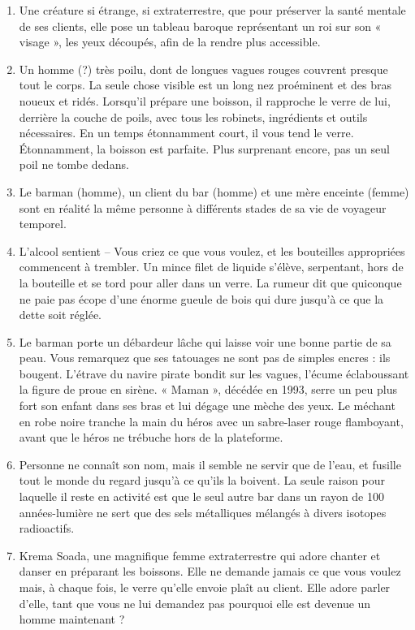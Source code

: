 \documentclass{article}
\begin{document}
\begin{enumerate}
	\item Une créature si étrange, si extraterrestre, que pour préserver la santé mentale de ses clients, elle pose un tableau baroque représentant un roi sur son « visage », les yeux découpés, afin de la rendre plus accessible.
	\item Un homme (?) très poilu, dont de longues vagues rouges couvrent presque tout le corps. La seule chose visible est un long nez proéminent et des bras noueux et ridés. Lorsqu’il prépare une boisson, il rapproche le verre de lui, derrière la couche de poils, avec tous les robinets, ingrédients et outils nécessaires. En un temps étonnamment court, il vous tend le verre. Étonnamment, la boisson est parfaite. Plus surprenant encore, pas un seul poil ne tombe dedans.
	\item Le barman (homme), un client du bar (homme) et une mère enceinte (femme) sont en réalité la même personne à différents stades de sa vie de voyageur temporel.
	\item L’alcool sentient – Vous criez ce que vous voulez, et les bouteilles appropriées commencent à trembler. Un mince filet de liquide s’élève, serpentant, hors de la bouteille et se tord pour aller dans un verre. La rumeur dit que quiconque ne paie pas écope d’une énorme gueule de bois qui dure jusqu’à ce que la dette soit réglée.
	\item Le barman porte un débardeur lâche qui laisse voir une bonne partie de sa peau. Vous remarquez que ses tatouages ne sont pas de simples encres : ils bougent. L’étrave du navire pirate bondit sur les vagues, l’écume éclaboussant la figure de proue en sirène. « Maman », décédée en 1993, serre un peu plus fort son enfant dans ses bras et lui dégage une mèche des yeux. Le méchant en robe noire tranche la main du héros avec un sabre-laser rouge flamboyant, avant que le héros ne trébuche hors de la plateforme.
	\item Personne ne connaît son nom, mais il semble ne servir que de l’eau, et fusille tout le monde du regard jusqu’à ce qu’ils la boivent. La seule raison pour laquelle il reste en activité est que le seul autre bar dans un rayon de 100 années-lumière ne sert que des sels métalliques mélangés à divers isotopes radioactifs.
	\item Krema Soada, une magnifique femme extraterrestre qui adore chanter et danser en préparant les boissons. Elle ne demande jamais ce que vous voulez mais, à chaque fois, le verre qu’elle envoie plaît au client. Elle adore parler d’elle, tant que vous ne lui demandez pas pourquoi elle est devenue un homme maintenant ?

\end{enumerate}
\end{document}
